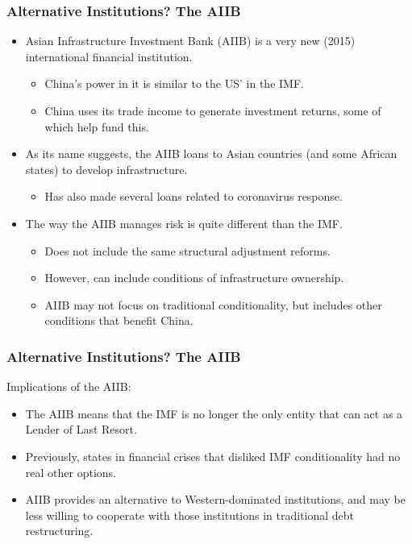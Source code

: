 \documentclass{beamer}
\begin{document}
\begin{frame} 
	\frametitle{\LARGE{Alternative Institutions? The AIIB}}
	\begin{itemize}
			\item Asian Infrastructure Investment Bank (AIIB) is a very new (2015) international financial institution. \pause 
			\begin{itemize}
			    \item China's power in it is similar to the US' in the IMF. \pause 
			    \item China uses its trade income to generate investment returns, some of which help fund this. \pause
			 \end{itemize}
			\item As its name suggests, the AIIB loans to Asian countries (and some African states) to develop infrastructure. \pause 
			\begin{itemize}
			    \item Has also made several loans related to coronavirus response. \pause 
			    \end{itemize}
			\item The way the AIIB manages risk is quite different than the IMF. \pause 
			\begin{itemize}
			    \item Does not include the same structural adjustment reforms. \pause 
			    \item However, can include conditions of infrastructure ownership. \pause 
			    \item AIIB may not focus on traditional conditionality, but includes other conditions that benefit China.
		    \end{itemize}
	\end{itemize}
\end{frame}

\begin{frame} 
	\frametitle{\LARGE{Alternative Institutions? The AIIB}}
Implications of the AIIB:
	\begin{itemize}
		\item The AIIB means that the IMF is no longer the only entity that can act as a Lender of Last Resort. \pause
		\item Previously, states in financial crises that disliked IMF conditionality had no real other options. \pause
		\item AIIB provides an alternative to Western-dominated institutions, and may be less willing to cooperate with those institutions in traditional debt restructuring. \pause
	\end{itemize}
\end{frame}
\end{document}

